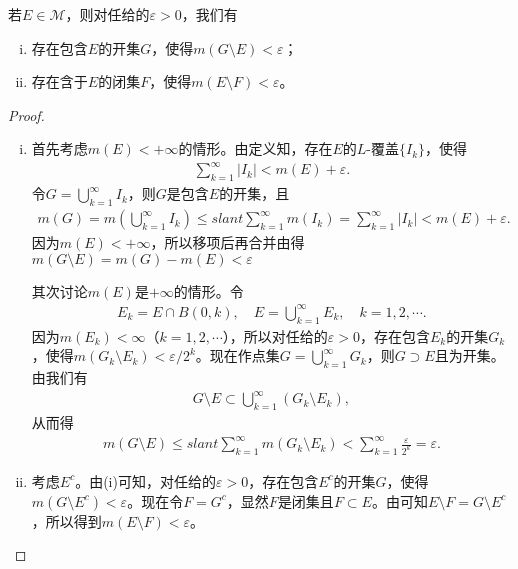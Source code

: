 \documentclass[../../main.tex]{subfiles}
\begin{document}
\begin{theorem}\label{theorem:定理2.13}
若$E\in\mathscr{M}$，则对任给的$\varepsilon > 0$，我们有
\begin{enumerate}[(i)]
\item 存在包含$E$的开集$G$，使得$m(G\setminus E)<\varepsilon$；
\item 存在含于$E$的闭集$F$，使得$m(E\setminus F)<\varepsilon$。
\end{enumerate}
\end{theorem}
\begin{proof}
\begin{enumerate}[(i)]
\item 首先考虑$m(E)<+\infty$的情形。由定义知，存在$E$的$L$-覆盖$\{I_k\}$，使得
\begin{align*}
\sum_{k = 1}^{\infty}|I_k|<m(E)+\varepsilon.
\end{align*}
令$G = \bigcup_{k = 1}^{\infty}I_k$，则$G$是包含$E$的开集，且
\begin{align*}
m\left( G \right) =m\left( \bigcup_{k=1}^{\infty}{I_k} \right) \leqslant slant \sum_{k=1}^{\infty}{m\left( I_k \right)}=\sum_{k=1}^{\infty}{\left| I_k \right|}<m(E)+\varepsilon .
\end{align*}
因为$m(E)<+\infty$，所以移项后再合并由得$m(G\setminus E)=m(G)-m(E)<\varepsilon$

其次讨论$m(E)$是$+\infty$的情形。令
\begin{align*}
E_k = E\cap B(0,k),\quad E=\bigcup_{k = 1}^{\infty}E_k,\quad k = 1,2,\cdots.
\end{align*}
因为$m(E_k)<\infty$（$k = 1,2,\cdots$），所以对任给的$\varepsilon>0$，存在包含$E_k$的开集$G_k$，使得$m(G_k\setminus E_k)<\varepsilon/2^k$。现在作点集$G = \bigcup_{k = 1}^{\infty}G_k$，则$G\supset E$且为开集。由我们有
\begin{align*}
G\setminus E\subset\bigcup_{k = 1}^{\infty}(G_k\setminus E_k),
\end{align*}
从而得
\begin{align*}
m(G\setminus E)\leqslant slant\sum_{k = 1}^{\infty}m(G_k\setminus E_k)<\sum_{k = 1}^{\infty}\frac{\varepsilon}{2^k}=\varepsilon.
\end{align*}
\item 考虑$E^c$。由(i)可知，对任给的$\varepsilon>0$，存在包含$E^c$的开集$G$，使得$m(G\setminus E^c)<\varepsilon$。现在令$F = G^c$，显然$F$是闭集且$F\subset E$。由可知$E\setminus F = G\setminus E^c$，所以得到$m(E\setminus F)<\varepsilon$。
\end{enumerate}
\end{proof}
\end{document}
